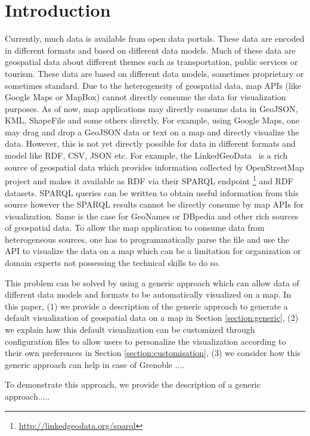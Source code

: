 \documentclass[a4paper,pagenum,english]{rnti}
\affiliation{
    \affil{1}Univ Lyon, MINES Saint-\'Etienne, CNRS, Laboratoire Hubert Curien UMR 5516, \\F-42023 Saint-\'Etienne, France\\
          \{prenom.nom\}@emse.fr\\
    \affil{2}Mondeca, \\ 35 boulevard Strasbourg, Paris, France\\
          ghislain.atemezing@mondeca.com\\
 }
\begin{document}
\section{Introduction}
Currently, much data is available from open data portals. These data are encoded in different formats and based on different data models. Much of these data are geospatial data about different themes such as transportation, public services or tourism. These data are based on different data models, sometimes proprietary or sometimes standard. Due to the heterogeneity of geospatial data, map APIs (like Google Maps or MapBox) cannot directly consume the data for visualization purposes. As of now, map applications may directly consume data in GeoJSON, KML, ShapeFile and some others directly. For example, using Google Maps, one may drag and drop a GeoJSON data or text on a map and directly visualize the data. However, this is not yet directly possible for data in different formats and model like RDF, CSV, JSON etc. For example, the LinkedGeoData~\cite{stadler2012linkedgeodata} is a rich source of geospatial data which provides information collected by OpenStreetMap project and makes it available as RDF via their SPARQL endpoint \footnote{\url{http://linkedgeodata.org/sparql}} and RDF datasets. SPARQL queries can be written to obtain useful information from this source however the SPARQL results cannot be directly consume by map APIs for visualization. Same is the case for GeoNames or DBpedia and other rich sources of geospatial data. To allow the map application to consume data from heterogeneous sources, one has to programmatically parse the file and use the API to visualize the data on a map which can be a limitation for organization or domain experts not possessing the technical skills to do so.

This problem can be solved by using a generic approach which can allow data of different data models and formats to be automatically visualized on a map. In this paper, (1) we provide a description of the generic approach to generate a default visualization of geospatial data on a map in Section \ref{section:generic}, (2) we explain how this default visualization can be customized through configuration files to allow users to personalize the visualization according to their own preferences in Section \ref{section:customisation}, (3) we consider how this generic approach can help in case of Grenoble ....


To demonstrate this approach, we provide the description of a generic approach.....
\end{document}
